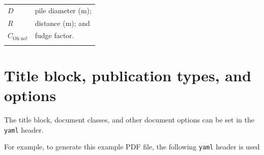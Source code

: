 \documentclass[Journal,LineNumbers]{ascelike-new}
\begin{document}
\begin{tabular}[]{@{}ll@{}}
\toprule\noalign{}

\(D\) & pile diameter (m); \\
\(R\) & distance (m); and \\
\(C_{\mathrm{Oh\;no!}}\) & fudge factor. \\
\bottomrule\noalign{}
\end{tabular}

\section{Title block, publication types, and
options}\label{sec-app-options}

The title block, document classes, and other document options can be set
in the \texttt{yaml} header.

For example, to generate this example PDF file, the following
\texttt{yaml} header is used
\end{document}
